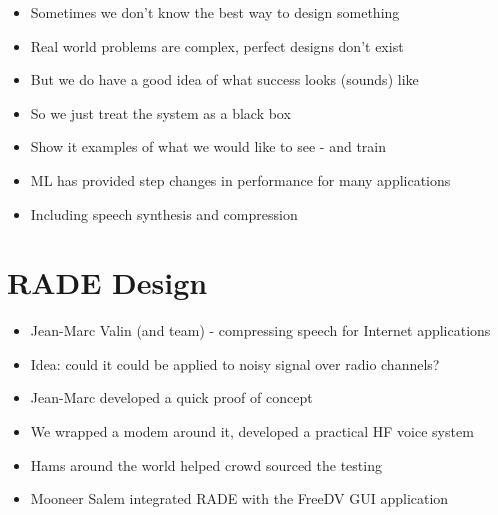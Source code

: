 \documentclass{beamer}
\begin{document}
\begin{frame}
\begin{itemize}
	\item Sometimes we don't know the best way to design something
	\item Real world problems are complex, perfect designs don't exist
	\item But we do have a good idea of what success looks (sounds) like
	\item So we just treat the system as a black box
	\item Show it examples of what we would like to see - and train
	\item ML has provided step changes in performance for many applications
	\item Including speech synthesis and compression
\end{itemize}
\end{frame}

\section{RADE Design}

\begin{frame}
\begin{itemize}
	\item Jean-Marc Valin (and team) - compressing speech for Internet applications
    \item Idea: could it could be applied to noisy signal over radio channels?
    \item Jean-Marc developed a quick proof of concept
    \item We wrapped a modem around it, developed a practical HF voice system
    \item Hams around the world helped crowd sourced the testing
    \item Mooneer Salem integrated RADE with the FreeDV GUI application
\end{itemize}
\end{frame}
\end{document}
